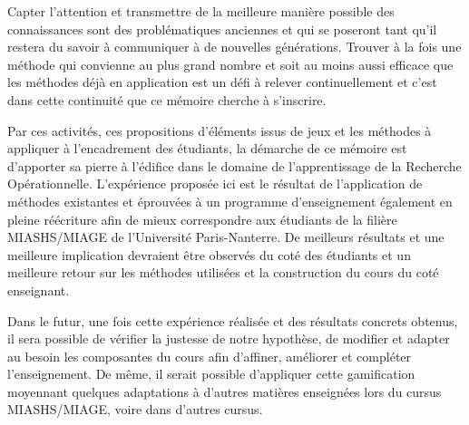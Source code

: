 Capter l'attention et transmettre de la meilleure manière possible des connaissances sont des problématiques anciennes et qui se poseront tant qu'il restera du savoir à communiquer à de nouvelles générations. Trouver à la fois une méthode qui convienne au plus grand nombre et soit au moins aussi efficace que les méthodes déjà en application est un défi à relever continuellement et c'est dans cette continuité que ce mémoire cherche à s'inscrire. \par

Par ces activités, ces propositions d'éléments issus de jeux et les méthodes à appliquer à l'encadrement des étudiants, la démarche de ce mémoire est d'apporter sa pierre à l'édifice dans le domaine de l'apprentissage de la Recherche Opérationnelle. L'expérience proposée ici est le résultat de l'application de méthodes existantes et éprouvées à un programme d'enseignement également en pleine réécriture afin de mieux correspondre aux étudiants de la filière MIASHS/MIAGE de l'Université Paris-Nanterre. De meilleurs résultats et une meilleure implication devraient être observés du coté des étudiants et un meilleure retour sur les méthodes utilisées et la construction du cours du coté enseignant. \par

Dans le futur, une fois cette expérience réalisée et des résultats concrets obtenus, il sera possible de vérifier la justesse de notre hypothèse, de modifier et adapter au besoin les composantes du cours afin d'affiner, améliorer et compléter l'enseignement. De même, il serait possible d'appliquer cette gamification moyennant quelques adaptations à d'autres matières enseignées lors du cursus MIASHS/MIAGE, voire dans d'autres cursus.